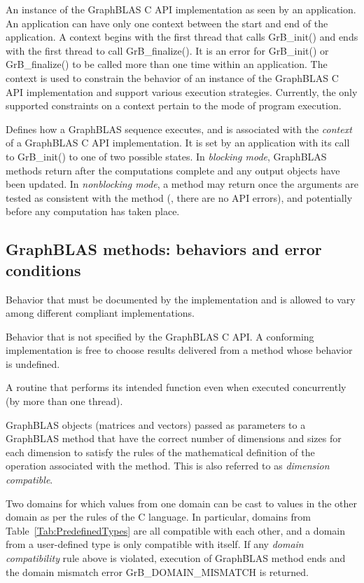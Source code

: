   An instance of the GraphBLAS C API implementation
as seen by an application.  An application can have only one context between the 
start and end of the application.  
A context begins with the first thread that calls {\sf GrB\_init()} and ends with the 
first thread to call {\sf GrB\_finalize()}.  
It is an error for {\sf GrB\_init()} or {\sf GrB\_finalize()} to be called more than one
time within an application.  The context is used to constrain the behavior of an
instance of the GraphBLAS C API implementation and support various execution strategies.
Currently, the only
supported constraints on a context pertain to the mode of program execution.

 Defines how a GraphBLAS sequence executes, and is associated 
with the {\it context} of a GraphBLAS C API implementation. It is set by an 
application with its call to {\sf GrB\_init()} to one of two possible states.  
In \emph{blocking mode}, GraphBLAS methods return after the computations 
complete and any output objects have been updated.  In {\it nonblocking mode}, a 
method may return once the arguments are tested as consistent with 
the method (\ie, there are no API errors), and potentially before any computation 
has taken place.
\glossEnd

\subsection{GraphBLAS methods: behaviors and error conditions}
\glossBegin
{} Behavior that must be documented
by the implementation and is allowed to vary among different
compliant implementations. 

 Behavior that is not specified by the GraphBLAS C API.
A conforming implementation is free to choose results delivered from a method
whose behavior is undefined. 

 A routine that performs its intended 
function even when executed concurrently (by more than one thread).

 GraphBLAS objects (matrices and vectors) 
passed as parameters to a GraphBLAS method that have the correct number of dimensions 
and sizes for each dimension to satisfy the rules of the mathematical definition 
of the operation associated with the method.  This is also referred to as 
\emph{dimension compatible}.

 Two domains for which values from one domain can be 
cast to values in the other domain as per the rules of the C language. In particular, 
domains from Table~\ref{Tab:PredefinedTypes} 
are all compatible with each other, and a domain from a user-defined type is only 
compatible with itself. If any \emph{domain compatibility} rule above is 
violated, execution of GraphBLAS method ends and the domain 
mismatch error {\sf GrB\_DOMAIN\_MISMATCH} is returned.
\glossEnd

